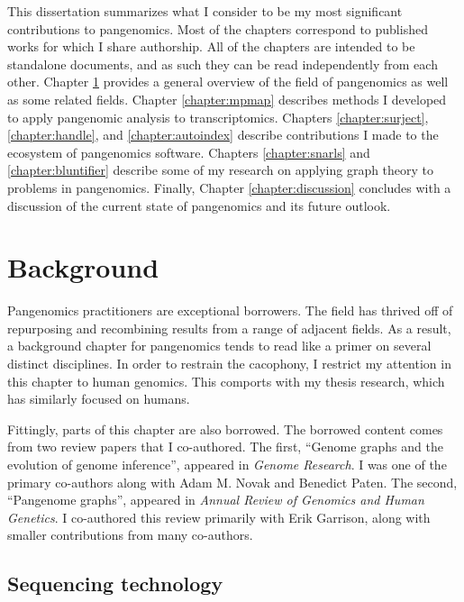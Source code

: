 \documentclass[11pt]{ucthesis}
\begin{document}
This dissertation summarizes what I consider to be my most significant contributions to pangenomics. Most of the chapters correspond to published works for which I share authorship. All of the chapters are intended to be standalone documents, and as such they can be read independently from each other. Chapter \ref{chapter:background} provides a general overview of the field of pangenomics as well as some related fields. Chapter \ref{chapter:mpmap} describes methods I developed to apply pangenomic analysis to transcriptomics. Chapters \ref{chapter:surject}, \ref{chapter:handle}, and \ref{chapter:autoindex} describe contributions I made to the ecosystem of pangenomics software. Chapters \ref{chapter:snarls} and \ref{chapter:bluntifier} describe some of my research on applying graph theory to problems in pangenomics. Finally, Chapter \ref{chapter:discussion} concludes with a discussion of the current state of pangenomics and its future outlook.

\chapter{Background}

\label{chapter:background}

Pangenomics practitioners are exceptional borrowers. The field has thrived off of repurposing and recombining results from a range of adjacent fields. As a result, a background chapter for pangenomics tends to read like a primer on several distinct disciplines. In order to restrain the cacophony, I restrict my attention in this chapter to human genomics. This comports with my thesis research, which has similarly focused on humans. 

Fittingly, parts of this chapter are also borrowed. The borrowed content comes from two review papers that I co-authored. The first, ``Genome graphs and the evolution of genome inference'', appeared in \emph{Genome Research}. I was one of the primary co-authors along with Adam M. Novak and Benedict Paten\cite{paten2017genome}. The second, ``Pangenome graphs'', appeared in \emph{Annual Review of Genomics and Human Genetics}. I co-authored this review primarily with Erik Garrison, along with smaller contributions from many co-authors\cite{eizenga2020pangenome}.

\section{Sequencing technology}
\end{document}
